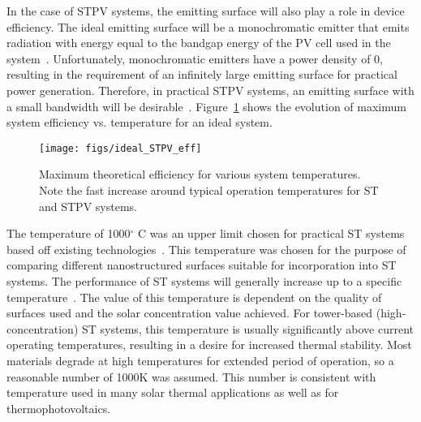 \documentclass[10pt,letterpaper]{article}
\begin{document}
{In the case of STPV systems, the emitting 
surface will also play a role in device efficiency.  The ideal emitting 
surface will be a monochromatic emitter that emits radiation with energy equal to the 
bandgap energy of the PV cell used in the system~\cite{L_AIP_2007}.  Unfortunately, monochromatic 
emitters have a power density of 0, resulting in the requirement of an infinitely large 
emitting surface for practical power generation.  Therefore, in practical STPV systems, an 
emitting surface with a small bandwidth will be desirable~\cite{RF_OptExp_2009}.  
Figure~\ref{Ideal} 
shows the evolution of maximum system efficiency vs. temperature for an ideal system.
\begin{figure}[h]
\begin{center}
        \texttt{[image: figs/ideal\_STPV\_eff]}
        \caption{\label{Ideal} Maximum theoretical efficiency for various system temperatures.  Note the fast increase
around typical operation temperatures for ST and STPV systems.}
\end{center}
\end{figure}

The temperature of 1000$^{\circ}$ C was an upper limit chosen for practical ST systems based off existing 
technologies~\cite{RKR_RenEnRev_2013, g2}.  This temperature was chosen for the purpose of comparing different nanostructured 
surfaces suitable for incorporation into ST systems.  The performance of ST systems will generally 
increase up to a specific temperature~\cite{MS_EnConvMan_2012}.  The value of this temperature is dependent on the 
quality of surfaces used and the solar concentration value achieved.  For tower-based (high-concentration) 
ST systems, this temperature is usually significantly above current operating temperatures, resulting in a 
desire for increased thermal stability. Most materials degrade at high temperatures for extended period of 
operation, so a reasonable number of 1000K was assumed. This number is consistent with temperature used in 
many solar thermal applications as well as for thermophotovoltaics.

}
\end{document}
